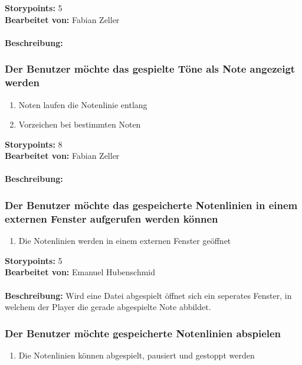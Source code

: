 \textbf{Storypoints:} 5 \\
\textbf{Bearbeitet von:} Fabian Zeller \\
\\
\textbf{Beschreibung:} 


\subsubsection{Der Benutzer möchte das gespielte Töne als Note angezeigt werden}

\begin{enumerate}
 \item Noten laufen die Notenlinie entlang
 \item Vorzeichen bei bestimmten Noten
\end{enumerate}

\textbf{Storypoints:} 8 \\
\textbf{Bearbeitet von:} Fabian Zeller \\
\\
\textbf{Beschreibung:} 


\subsubsection{Der Benutzer möchte das gespeicherte Notenlinien in einem externen Fenster aufgerufen 
werden können}

\begin{enumerate}
 \item Die Notenlinien  werden in einem externen Fenster geöffnet
\end{enumerate}

\textbf{Storypoints:} 5 \\
\textbf{Bearbeitet von:} Emanuel Hubenschmid \\
\\
\textbf{Beschreibung:} Wird eine Datei abgespielt öffnet sich ein seperates Fenster, in welchem der 
Player die gerade abgespielte Note abbildet.


\subsubsection{Der Benutzer möchte gespeicherte Notenlinien abspielen}

\begin{enumerate}
 \item Die Notenlinien  können abgespielt, pausiert und gestoppt werden
\end{enumerate}

